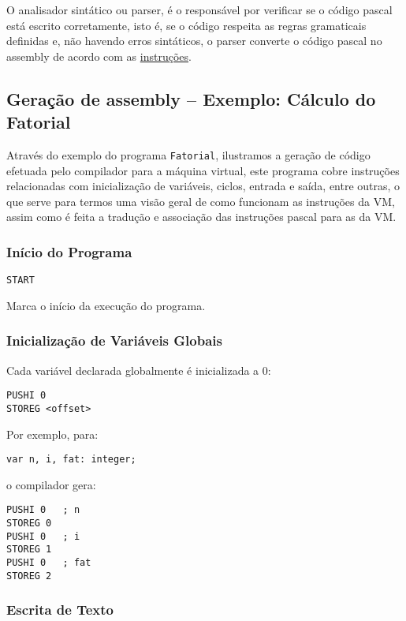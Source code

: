 \documentclass[12pt,a4paper]{report}%
\begin{document}
O analisador sintático ou parser,  é o responsável por verificar se o código pascal está escrito corretamente, isto é, se o código respeita as regras gramaticais definidas e, não havendo erros sintáticos, o parser converte o código pascal no assembly de acordo com as \href{https://ewvm.epl.di.uminho.pt/manual}{instruções}.

\subsection{Geração de assembly – Exemplo: Cálculo do Fatorial}

Através do exemplo do programa \texttt{Fatorial}, ilustramos a geração de código efetuada pelo compilador para a máquina virtual, este programa cobre instruções relacionadas com inicialização de variáveis, ciclos, entrada e saída, entre outras, o que serve para termos uma visão geral de como funcionam as instruções da VM, assim como é feita a tradução e associação das instruções pascal para as da VM.


\subsubsection{Início do Programa}

\begin{verbatim}
START
\end{verbatim}

Marca o início da execução do programa.

\subsubsection{Inicialização de Variáveis Globais}

Cada variável declarada globalmente é inicializada a 0:

\begin{verbatim}
PUSHI 0
STOREG <offset>
\end{verbatim}

Por exemplo, para:
\begin{verbatim}
var n, i, fat: integer;
\end{verbatim}
o compilador gera:
\begin{verbatim}
PUSHI 0   ; n
STOREG 0
PUSHI 0   ; i
STOREG 1
PUSHI 0   ; fat
STOREG 2
\end{verbatim}

\subsubsection{Escrita de Texto}
\end{document}
